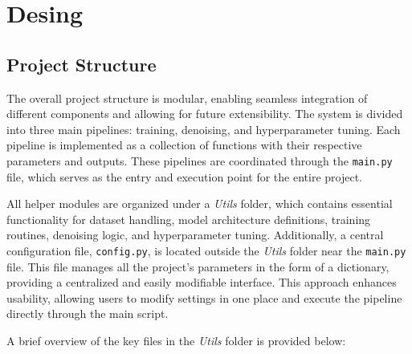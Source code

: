 \graphicspath{{content/chapters/5_design/figures/}}
\chapter{Desing}
\label{chp:design}

\section{Project Structure}
\label{sec:project_structure}

The overall project structure is modular, enabling seamless integration of different components and allowing for future extensibility. The system is divided into three main pipelines: training, denoising, and hyperparameter tuning. Each pipeline is implemented as a collection of functions with their respective parameters and outputs. These pipelines are coordinated through the \texttt{main.py} file, which serves as the entry and execution point for the entire project.

All helper modules are organized under a \textit{Utils} folder, which contains essential functionality for dataset handling, model architecture definitions, training routines, denoising logic, and hyperparameter tuning. Additionally, a central configuration file, \texttt{config.py}, is located outside the \textit{Utils} folder near the \texttt{main.py} file. This file manages all the project’s parameters in the form of a dictionary, providing a centralized and easily modifiable interface. This approach enhances usability, allowing users to modify settings in one place and execute the pipeline directly through the main script.

A brief overview of the key files in the \textit{Utils} folder is provided below:

